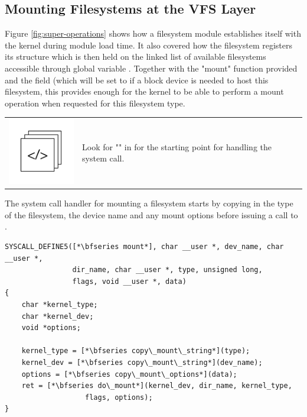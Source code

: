 
\subsection{Mounting Filesystems at the VFS Layer}

Figure \ref{fig:super-operations} shows how a filesystem module establishes itself with the kernel during module load time. It also covered how the filesystem registers its  structure which is then held on the linked list of available filesystems accessible through global variable . Together with the "mount" function provided and the  field (which will be set to  if a block device is needed to host this filesystem, this provides enough for the kernel to be able to perform a mount operation when requested for this filesystem type.

\begin{table}[h]
\begin{tabular}{ll}
\parbox[l]{0.6in}{\includegraphics[scale=0.8]{figures/src-xref.pdf}} & \parbox[l]{4in}{\small{Look for ""} in  for the starting point for handling the  system call.}
\end{tabular}
\end{table}

\noindent
The system call handler for mounting a filesystem starts by copying in the type of the filesystem, the device name and any mount options before issuing a call to .

\begin{lstlisting}
SYSCALL_DEFINE5([*\bfseries mount*], char __user *, dev_name, char __user *, 
                dir_name, char __user *, type, unsigned long, 
                flags, void __user *, data)
{
    char *kernel_type;
    char *kernel_dev;
    void *options;

    kernel_type = [*\bfseries copy\_mount\_string*](type);
    kernel_dev = [*\bfseries copy\_mount\_string*](dev_name);
    options = [*\bfseries copy\_mount\_options*](data);
    ret = [*\bfseries do\_mount*](kernel_dev, dir_name, kernel_type, 
                   flags, options);
}
\end{lstlisting}

